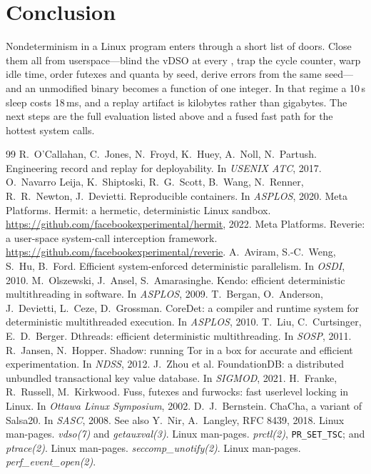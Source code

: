\documentclass[10pt,twocolumn]{article}
\newcommand{\sys}[1]{\texttt{\detokenize{#1}}}
\begin{document}
\section{Conclusion}
Nondeterminism in a Linux program enters through a short list of doors. Close them all from userspace---blind the vDSO at every \sys{exec}, trap the cycle counter, warp idle time, order futexes and quanta by seed, derive errors from the same seed---and an unmodified binary becomes a function of one integer. In that regime a 10\,s sleep costs 18\,ms, and a replay artifact is kilobytes rather than gigabytes. The next steps are the full evaluation listed above and a fused fast path for the hottest system calls.

\begin{thebibliography}{99}\small
{} R.~O'Callahan, C.~Jones, N.~Froyd, K.~Huey, A.~Noll, N.~Partush. Engineering record and replay for deployability. In \emph{USENIX ATC}, 2017.
 O.~Navarro Leija, K.~Shiptoski, R.~G.~Scott, B.~Wang, N.~Renner, R.~R.~Newton, J.~Devietti. Reproducible containers. In \emph{ASPLOS}, 2020.
 Meta Platforms. Hermit: a hermetic, deterministic Linux sandbox. \url{https://github.com/facebookexperimental/hermit}, 2022.
 Meta Platforms. Reverie: a user-space system-call interception framework. \url{https://github.com/facebookexperimental/reverie}.
 A.~Aviram, S.-C.~Weng, S.~Hu, B.~Ford. Efficient system-enforced deterministic parallelism. In \emph{OSDI}, 2010.
 M.~Olszewski, J.~Ansel, S.~Amarasinghe. Kendo: efficient deterministic multithreading in software. In \emph{ASPLOS}, 2009.
 T.~Bergan, O.~Anderson, J.~Devietti, L.~Ceze, D.~Grossman. CoreDet: a compiler and runtime system for deterministic multithreaded execution. In \emph{ASPLOS}, 2010.
 T.~Liu, C.~Curtsinger, E.~D.~Berger. Dthreads: efficient deterministic multithreading. In \emph{SOSP}, 2011.
 R.~Jansen, N.~Hopper. Shadow: running Tor in a box for accurate and efficient experimentation. In \emph{NDSS}, 2012.
 J.~Zhou et al. FoundationDB: a distributed unbundled transactional key value database. In \emph{SIGMOD}, 2021.
 H.~Franke, R.~Russell, M.~Kirkwood. Fuss, futexes and furwocks: fast userlevel locking in Linux. In \emph{Ottawa Linux Symposium}, 2002.
 D.~J.~Bernstein. ChaCha, a variant of Salsa20. In \emph{SASC}, 2008. See also Y.~Nir, A.~Langley, RFC 8439, 2018.
 Linux man-pages. \emph{vdso(7)} and \emph{getauxval(3)}.
 Linux man-pages. \emph{prctl(2)}, \texttt{PR\_SET\_TSC}; and \emph{ptrace(2)}.
 Linux man-pages. \emph{seccomp\_unotify(2)}.
 Linux man-pages. \emph{perf\_event\_open(2)}.
\end{thebibliography}
\end{document}
